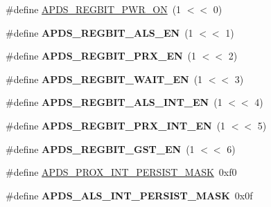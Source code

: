 \begin{DoxyCompactItemize}
\item 
\#define \hyperlink{group__APDS9960__FunctionDefines_gaf32cfb36ea4a3b0c1e3a524983eddaaa}{A\+P\+D\+S\+\_\+\+R\+E\+G\+B\+I\+T\+\_\+\+P\+W\+R\+\_\+\+ON}~(1 $<$$<$ 0)
\item 
\mbox{\label{group__APDS9960__FunctionDefines_ga41c479318df6f4a64b008a2301c5df5b}} 
\#define {\bfseries A\+P\+D\+S\+\_\+\+R\+E\+G\+B\+I\+T\+\_\+\+A\+L\+S\+\_\+\+EN}~(1 $<$$<$ 1)
\item 
\mbox{\label{group__APDS9960__FunctionDefines_ga2e70cfa740da848bac66c66b3ead7927}} 
\#define {\bfseries A\+P\+D\+S\+\_\+\+R\+E\+G\+B\+I\+T\+\_\+\+P\+R\+X\+\_\+\+EN}~(1 $<$$<$ 2)
\item 
\mbox{\label{group__APDS9960__FunctionDefines_gad4da86968b12e4f4a8ffc6b1cd296c84}} 
\#define {\bfseries A\+P\+D\+S\+\_\+\+R\+E\+G\+B\+I\+T\+\_\+\+W\+A\+I\+T\+\_\+\+EN}~(1 $<$$<$ 3)
\item 
\mbox{\label{group__APDS9960__FunctionDefines_ga19121ebe9eee5149ec03abb6314258eb}} 
\#define {\bfseries A\+P\+D\+S\+\_\+\+R\+E\+G\+B\+I\+T\+\_\+\+A\+L\+S\+\_\+\+I\+N\+T\+\_\+\+EN}~(1 $<$$<$ 4)
\item 
\mbox{\label{group__APDS9960__FunctionDefines_gafee86e5f185098b278aea4d9994672c9}} 
\#define {\bfseries A\+P\+D\+S\+\_\+\+R\+E\+G\+B\+I\+T\+\_\+\+P\+R\+X\+\_\+\+I\+N\+T\+\_\+\+EN}~(1 $<$$<$ 5)
\item 
\mbox{\label{group__APDS9960__FunctionDefines_gad78582f0ab04ab9a963ec965cf0f064d}} 
\#define {\bfseries A\+P\+D\+S\+\_\+\+R\+E\+G\+B\+I\+T\+\_\+\+G\+S\+T\+\_\+\+EN}~(1 $<$$<$ 6)
\item 
\#define \hyperlink{group__APDS9960__FunctionDefines_ga5bfb0343f5d79b55a5fbd52eb1e6026a}{A\+P\+D\+S\+\_\+\+P\+R\+O\+X\+\_\+\+I\+N\+T\+\_\+\+P\+E\+R\+S\+I\+S\+T\+\_\+\+M\+A\+SK}~0xf0
\item 
\mbox{\label{group__APDS9960__FunctionDefines_gafd697856c76e3366fa58296d497093d3}} 
\#define {\bfseries A\+P\+D\+S\+\_\+\+A\+L\+S\+\_\+\+I\+N\+T\+\_\+\+P\+E\+R\+S\+I\+S\+T\+\_\+\+M\+A\+SK}~0x0f
$$
\end{DoxyCompactItemize}
